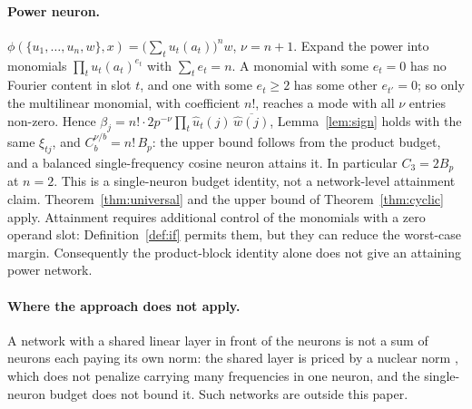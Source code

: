 \paragraph{Power neuron.} $\phi(\{u_1,\dots,u_n,w\},x)=\big(\sum_tu_t(a_t)\big)^n w$, $\nu=n+1$. Expand the power into monomials $\prod_tu_t(a_t)^{e_t}$ with $\sum_te_t=n$. A monomial with some $e_t=0$ has no Fourier content in slot $t$, and one with some $e_t\ge2$ has some other $e_{t'}=0$; so only the multilinear monomial, with coefficient $n!$, reaches a mode with all $\nu$ entries non-zero. Hence $\beta_j=n!\cdot2p^{-\nu}\prod_t\hat u_t(j)\,\overline{\hat w(j)}$, Lemma~\ref{lem:sign} holds with the same $\xi_{tj}$, and $C_b^{\nu/b}=n!\,B_p$: the upper bound follows from the product budget, and a balanced single-frequency cosine neuron attains it. In particular $C_3=2B_p$ at $n=2$. This is a single-neuron budget identity, not a network-level attainment claim. Theorem~\ref{thm:universal} and the upper bound of Theorem~\ref{thm:cyclic} apply. Attainment requires additional control of the monomials with a zero operand slot: Definition~\ref{def:if} permits them, but they can reduce the worst-case margin. Consequently the product-block identity alone does not give an attaining power network.


\paragraph{Where the approach does not apply.} A network with a shared linear layer in front of the neurons is not a sum of neurons each paying its own norm: the shared layer is priced by a nuclear norm \citep{srebro2004mmmf}, which does not penalize carrying many frequencies in one neuron, and the single-neuron budget does not bound it. Such networks are outside this paper.

